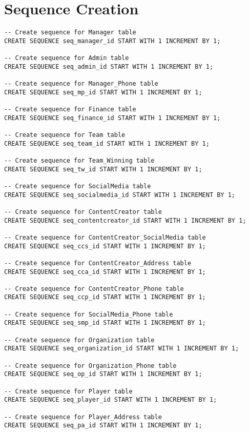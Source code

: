 \section{Sequence Creation}

\begin{lstlisting}[caption={Sequence Creation},label={lst:sequence}]
-- Create sequence for Manager table
CREATE SEQUENCE seq_manager_id START WITH 1 INCREMENT BY 1;

-- Create sequence for Admin table
CREATE SEQUENCE seq_admin_id START WITH 1 INCREMENT BY 1;

-- Create sequence for Manager_Phone table
CREATE SEQUENCE seq_mp_id START WITH 1 INCREMENT BY 1;

-- Create sequence for Finance table
CREATE SEQUENCE seq_finance_id START WITH 1 INCREMENT BY 1;

-- Create sequence for Team table
CREATE SEQUENCE seq_team_id START WITH 1 INCREMENT BY 1;

-- Create sequence for Team_Winning table
CREATE SEQUENCE seq_tw_id START WITH 1 INCREMENT BY 1;

-- Create sequence for SocialMedia table
CREATE SEQUENCE seq_socialmedia_id START WITH 1 INCREMENT BY 1;

-- Create sequence for ContentCreator table
CREATE SEQUENCE seq_contentcreator_id START WITH 1 INCREMENT BY 1;

-- Create sequence for ContentCreator_SocialMedia table
CREATE SEQUENCE seq_ccs_id START WITH 1 INCREMENT BY 1;

-- Create sequence for ContentCreator_Address table
CREATE SEQUENCE seq_cca_id START WITH 1 INCREMENT BY 1;

-- Create sequence for ContentCreator_Phone table
CREATE SEQUENCE seq_ccp_id START WITH 1 INCREMENT BY 1;

-- Create sequence for SocialMedia_Phone table
CREATE SEQUENCE seq_smp_id START WITH 1 INCREMENT BY 1;

-- Create sequence for Organization table
CREATE SEQUENCE seq_organization_id START WITH 1 INCREMENT BY 1;

-- Create sequence for Organization_Phone table
CREATE SEQUENCE seq_op_id START WITH 1 INCREMENT BY 1;

-- Create sequence for Player table
CREATE SEQUENCE seq_player_id START WITH 1 INCREMENT BY 1;

-- Create sequence for Player_Address table
CREATE SEQUENCE seq_pa_id START WITH 1 INCREMENT BY 1;


\end{lstlisting}
